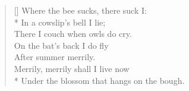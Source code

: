 \documentclass[MAIN]{subfiles}
\begin{document}
\settowidth{\versewidth}{Under the blossom that hangs on the bough.}
\begin{verse}[\versewidth]
Where the bee sucks, there suck I:\\* 
In a cowslip's bell I lie;\\
There I couch when owls do cry.\\
On the bat’s back I do fly\\
After summer merrily.\\
Merrily, merrily shall I live now\\*
Under the blossom that hangs on the bough.
\end{verse}
\end{document}
